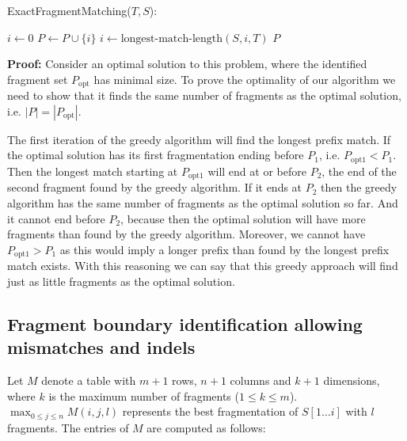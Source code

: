 \begin{algorithm}[H]
\caption{ExactFragmentMatching($T, S$):}
\begin{algorithmic}[1]
  \STATE $i \leftarrow 0$
    \STATE $P \leftarrow P\cup \{i\}$
    \STATE $i \leftarrow \text{longest-match-length}(S,i,T)$
  \ENDWHILE
  \RETURN $P$
\end{algorithmic}
\end{algorithm}

\textbf{Proof:} Consider an optimal solution to this problem, where the
identified fragment set $P_{\mathrm{opt}}$ has minimal size. To prove
the optimality of our algorithm we need to show that it finds the same
number of fragments as the optimal solution, i.e. $|P| =
|P_{\mathrm{opt}}|$.

The first iteration of the greedy algorithm will find the longest prefix
match. If the optimal solution has its first fragmentation ending before
$P_1$, i.e. $P_{\mathrm{opt1}} < P_1$. Then the longest match starting at
$P_{\mathrm{opt1}}$ will end at or before $P_2$, the end of the second
fragment found by the greedy algorithm. If it ends at $P_2$ then the
greedy algorithm has the same number of fragments as the optimal
solution so far. And it cannot end before $P_2$, because then the
optimal solution will have more fragments than found by the greedy
algorithm. Moreover, we cannot have $P_{\mathrm{opt1}} > P_1$ as this
would imply a longer prefix than found by the longest prefix match
exists. With this reasoning we can say that this greedy approach will
find just as little fragments as the optimal solution.

\subsection{Fragment boundary identification allowing mismatches and indels}
Let $M$ denote a table with $m+1$ rows, $n+1$ columns and $k+1$
dimensions, where $k$ is the maximum number of fragments ($1 \leq k \leq
m$).  $\max_{0 \leq j \leq n}M(i,j,l)$ represents the best fragmentation
of $S[1 \dots i]$ with $l$ fragments. The entries of $M$ are computed as
follows:

